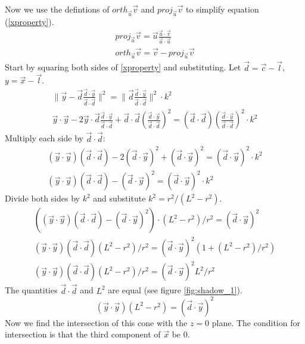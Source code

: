 \documentclass[10pt]{article}
\begin{document}
\begin{appendices}
Now we use the defintions of $orth_{\vec{u}} \vec{v}$ and $proj_{\vec{u}} \vec{v}$ to simplify equation (\ref{xproperty}).
\begin{align*}
proj_{\vec{u}} \vec{v} = \vec{u} \frac{\vec{u}\cdot\vec{v}}{\vec{u}\cdot\vec{u}}\\
orth_{\vec{u}} \vec{v} = \vec{v} - proj_{\vec{u}} \vec{v}
\end{align*}
Start by squaring both sides of \ref{xproperty} and substituting. Let $\vec{d} = \vec{c}-\vec{l}$, $y = \vec{x}-\vec{l}$.
\begin{align*}
\|\vec{y} - \vec{d} \frac{\vec{d}\cdot\vec{y}}{\vec{d}\cdot\vec{d}}\|^2 = \|\vec{d} \frac{\vec{d}\cdot\vec{y}}{\vec{d}\cdot\vec{d}}\|^2 \cdot k^2\\
\vec{y}\cdot\vec{y}-2\vec{y}\cdot\vec{d} \frac{\vec{d}\cdot\vec{y}}{\vec{d}\cdot\vec{d}}+\vec{d}\cdot\vec{d}(\frac{\vec{d}\cdot\vec{y}}{\vec{d}\cdot\vec{d}})^2 = (\vec{d}\cdot\vec{d}) (\frac{\vec{d}\cdot\vec{y}}{\vec{d}\cdot\vec{d}})^2 \cdot k^2
\end{align*}
Multiply each side by $\vec{d}\cdot\vec{d}$:
\begin{align*}
(\vec{y}\cdot\vec{y})(\vec{d}\cdot\vec{d})-2(\vec{d}\cdot\vec{y})^2+(\vec{d}\cdot\vec{y})^2  = (\vec{d}\cdot\vec{y})^2 \cdot k^2\\
(\vec{y}\cdot\vec{y})(\vec{d}\cdot\vec{d})-(\vec{d}\cdot\vec{y})^2  = (\vec{d}\cdot\vec{y})^2 \cdot k^2
\end{align*}
Divide both sides by $k^2$ and substitute $k^2 = r^2 / ( L^2-r^2)$.
\begin{align*}
((\vec{y}\cdot\vec{y})(\vec{d}\cdot\vec{d})-(\vec{d}\cdot\vec{y})^2)\cdot ( L^2-r^2)/r^2 =  (\vec{d}\cdot\vec{y})^2\\
(\vec{y}\cdot\vec{y})(\vec{d}\cdot\vec{d})( L^2-r^2)/r^2 =  (\vec{d}\cdot\vec{y})^2(1 + ( L^2-r^2)/r^2)\\
(\vec{y}\cdot\vec{y})(\vec{d}\cdot\vec{d})( L^2-r^2)/r^2 =  (\vec{d}\cdot\vec{y})^2 L^2/r^2
\end{align*}
The quantities $\vec{d}\cdot\vec{d}$ and $L^2$ are equal (see figure \ref{fig:shadow_1}).
\[
(\vec{y}\cdot\vec{y})( L^2-r^2) =  (\vec{d}\cdot\vec{y})^2
\]
Now we find the intersection of this cone with the $z=0$ plane. The condition for intersection is that the third component of $\vec{x}$ be $0$.

\end{appendices}
\end{document}
